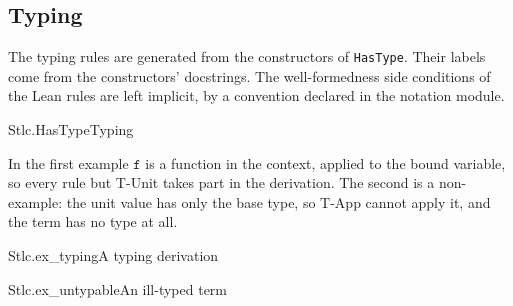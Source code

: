 \documentclass{article}
\begin{document}
\subsection{Typing}

The typing rules are generated from the constructors of \texttt{HasType}.
Their labels come from the constructors' docstrings. The well-formedness side
conditions of the Lean rules are left implicit, by a convention declared in
the notation module.

\begin{leanrules}[sum=nDDgEQ1-Ha]{Stlc.HasType}{Typing}
\end{leanrules}

In the first example $\mathtt{f}$ is a function in the context, applied to the bound
variable, so every rule but T-Unit takes part in the derivation. The second
is a non-example: the unit value has only the base type, so T-App cannot
apply it, and the term has no type at all.

\begin{leanexample}[sum=9sob_x5VgU]{Stlc.ex_typing}{A typing derivation}
\label{ex:Stlc.ex_typing}
\end{leanexample}

\begin{leanexample}[sum=dDOa2hR2cX]{Stlc.ex_untypable}{An ill-typed term}
\label{ex:Stlc.ex_untypable}
\end{leanexample}
\end{document}
